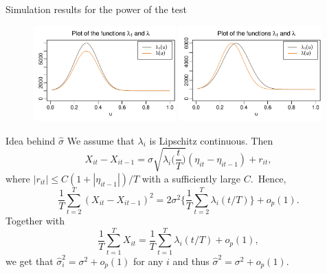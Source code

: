 \documentclass[10pt]{beamer}
\begin{document}
\begin{frame}{Simulation results for the power of the test}
\begin{figure}[t!]
	\includegraphics[width = 0.49\textwidth, height = 0.4\textheight]{plots/lambda_fcts_height}
	\onslide<2->\includegraphics[width = 0.49\textwidth, height = 0.4\textheight]{plots/lambda_fcts_shift}	
\end{figure}\pause
\vspace{-5mm}
{\scriptsize{\begin{table}[t]
\begin{center}
\caption{Power of the multiscale test for scenario A}
\label{tab:size_shape}

\end{center}
\end{table}}}
{
\vspace{-39.5mm}
\scriptsize{\begin{table}[t]
\begin{center}
\caption{Power of the multiscale test for scenario B}
\label{tab:size_shape}

\end{center}
\end{table}}}
\end{frame}

\begin{frame}[label = frame_sigma]{Idea behind $\hat{\sigma}$}
We assume that $\lambda_i$ is Lipschitz continuous. Then
\[ X_{it} - X_{it-1} = \sigma \sqrt{\lambda_i\Big(\frac{t}{T}\Big)} (\eta_{it} - \eta_{it-1}) + r_{it}, \]
where $|r_{it}| \le C(1+|\eta_{it-1}|)/T$ with a sufficiently large $C$.\pause \, Hence,
\[ \frac{1}{T} \sum_{t=2}^T (X_{it} - X_{it-1})^2 = 2 \sigma^2 \Big\{ \frac{1}{T} \sum_{t=2}^T \lambda_i(t/T) \Big\} + o_p(1).\] \pause
Together with \[ \frac{1}{T} \sum_{t=1}^T X_{it} = \frac{1}{T} \sum_{t=1}^T \lambda_i(t/T) + o_p(1), \] we get that $\hat{\sigma}_i^2 = \sigma^2 + o_p(1)$ for any $i$ and thus $\hat{\sigma}^2 = \sigma^2 + o_p(1)$.

\hyperlink{frame_teststatistic}{}
\end{frame}
\end{document}
